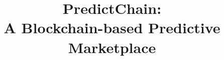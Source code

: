 \documentclass{ledger}
\title{PredictChain:\\
A Blockchain-based Predictive Marketplace}
\begin{document}
\maketitle

\thispagestyle{pagefirst}

\begin{abstract}





\end{abstract}
\end{document}
